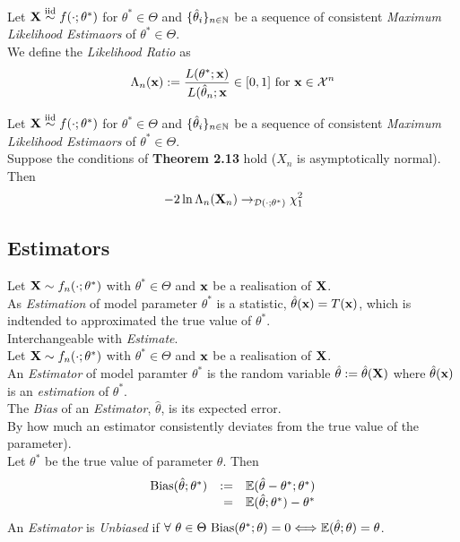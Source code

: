 \documentclass[11pt,a4paper]{article}
\begin{document}
Let $\textbf{X}\overset{\text{iid}}{\sim} f(\cdot;\theta^*)$ for $\theta^*\in\Theta$ and $\{\hat\theta_i\}_{n\in\mathbb{N}}$ be a sequence of consistent \textit{Maximum Likelihood Estimaors} of $\theta^*\in\Theta$.\\
We define the \textit{Likelihood Ratio} as
$$\Lambda_n(\textbf{x}):=\frac{L(\theta^*;\textbf{x})}{L(\hat\theta_n;\textbf{x}}\in[0,1]\text{ for }\textbf{x}\in\mathcal{X}^n$$

Let $\textbf{X}\overset{\text{iid}}{\sim} f(\cdot;\theta^*)$ for $\theta^*\in\Theta$ and $\{\hat\theta_i\}_{n\in\mathbb{N}}$ be a sequence of consistent \textit{Maximum Likelihood Estimaors} of $\theta^*\in\Theta$.\\
Suppose the conditions of \textbf{Theorem 2.13} hold (\ie $X_n$ is asymptotically normal). Then
$$-2\ln\Lambda_n(\textbf{X}_n)\to_{\mathcal{D}(\cdot;\theta^*)}\chi^2_1$$

\subsection{Estimators}

Let $\textbf{X}\sim f_n(\cdot;\theta^*)$ with $\theta^*\in\Theta$ and $\textbf{x}$ be a realisation of $\textbf{X}$.\\
As \textit{Estimation} of model parameter $\theta^*$ is a statistic, $\hat\theta(\textbf{x})=T(\textbf{x})$, which is indtended to approximated the true value of $\theta^*$.\\
\nb Interchangeable with \textit{Estimate}.\\

Let $\textbf{X}\sim f_n(\cdot;\theta^*)$ with $\theta^*\in\Theta$ and $\textbf{x}$ be a realisation of $\textbf{X}$.\\
An \textit{Estimator} of model paramter $\theta^*$ is the random variable $\hat\theta:=\hat\theta(\textbf{X})$ where $\hat\theta(\textbf{x})$ is an \textit{estimation} of $\theta^*$.\\

The \textit{Bias} of an \textit{Estimator}, $\hat\theta$, is its expected error.\\
\ie By how much an estimator consistently deviates from the true value of the parameter).\\
Let $\theta^*$ be the true value of parameter $\theta$. Then
\[\begin{array}{rrl}
\text{Bias}(\hat\theta;\theta^*)&:=&\mathbb{E}(\hat\theta-\theta^*;\theta^*)\\
&=&\mathbb{E}(\hat\theta;\theta^*)-\theta^*
\end{array}\]
\nb An \textit{Estimator} is \textit{Unbiased} if $\forall\ \theta\in\Theta\ \text{Bias}(\theta^*;\theta)=0\Longleftrightarrow\expect(\hat\theta;\theta)=\theta$.\\
\end{document}
